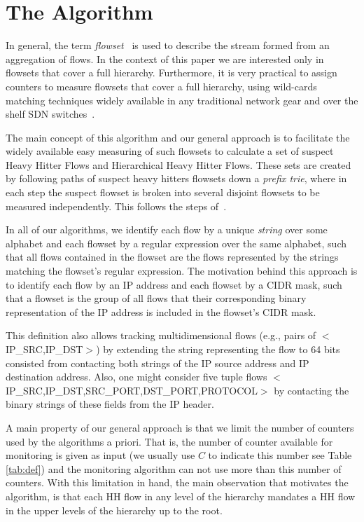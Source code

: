 \section{The \simpleAlgo Algorithm}

In general, the term \textit{flowset}~\cite{conf/sigcomm/YuanCM07} is used to describe the stream formed from an aggregation of flows.
In the context of this paper
we are interested only in flowsets that cover a full hierarchy.
Furthermore, it is very practical to assign counters to measure flowsets that cover a full hierarchy, using wild-cards matching techniques widely available in any traditional network gear and over the shelf SDN switches~\cite{OVS, OF1.5}.



The main concept of this algorithm and our general approach is to facilitate the widely available easy measuring of such flowsets to calculate a set of suspect Heavy Hitter Flows and Hierarchical Heavy Hitter Flows. These sets are created by following paths of suspect heavy hitters flowsets down a \textit{prefix trie}, where in each step the suspect flowset is broken into several disjoint flowsets to be measured independently. This follows the steps of~\cite{conf/sigcomm/YuanCM07,Moraney2016, Moraney2018}.

In all of our algorithms, we identify each flow by a unique \textit{string} over some alphabet and each flowset by a regular expression over the same alphabet, such that all flows contained in the flowset are the flows represented by the strings matching the flowset's regular expression. The motivation behind this approach is to identify each flow by an IP address and each flowset by a CIDR mask, such that a flowset is the group of all flows that their corresponding binary representation of the IP address is included in the flowset's CIDR mask.

This definition also allows tracking multidimensional flows (e.g., pairs of $<$IP\_SRC,IP\_DST$>$) by extending the string representing the flow to 64 bits consisted from contacting both strings of the IP source address and IP destination address. Also, one might consider five tuple flows $<$IP\_SRC,IP\_DST,SRC\_PORT,DST\_PORT,PROTOCOL$>$ by contacting the binary strings of these fields from the IP header.

A main property of our general approach is that we limit the number of counters used by the algorithms a priori. That is, the number of counter available for monitoring is given as input (we usually use $C$ to indicate this number see Table \ref{tab:def}) and the monitoring algorithm can not use  more than this number of counters.
With this limitation in hand, the main observation that motivates the algorithm, is that each HH flow in any level of the hierarchy mandates a HH flow in the upper levels of the hierarchy up to the root.


